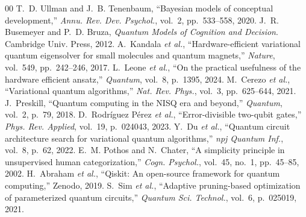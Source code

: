 \documentclass[10pt,conference]{IEEEtran}
\begin{document}
\begin{thebibliography}{00}
 T.~D. Ullman and J.~B. Tenenbaum, ``Bayesian models of conceptual development,'' \textit{Annu. Rev. Dev. Psychol.}, vol.~2, pp.~533--558, 2020.
 J.~R. Busemeyer and P.~D. Bruza, \textit{Quantum Models of Cognition and Decision}. Cambridge Univ. Press, 2012.
 A.~Kandala \textit{et al.}, ``Hardware-efficient variational quantum eigensolver for small molecules and quantum magnets,'' \textit{Nature}, vol.~549, pp.~242--246, 2017.
 L.~Leone \textit{et al.}, ``On the practical usefulness of the hardware efficient ansatz,'' \textit{Quantum}, vol.~8, p.~1395, 2024.
 M.~Cerezo \textit{et al.}, ``Variational quantum algorithms,'' \textit{Nat. Rev. Phys.}, vol.~3, pp.~625--644, 2021.
 J.~Preskill, ``Quantum computing in the NISQ era and beyond,'' \textit{Quantum}, vol.~2, p.~79, 2018.
 D.~Rodr\'iguez P\'erez \textit{et al.}, ``Error-divisible two-qubit gates,'' \textit{Phys. Rev. Applied}, vol.~19, p.~024043, 2023.
 Y.~Du \textit{et al.}, ``Quantum circuit architecture search for variational quantum algorithms,'' \textit{npj Quantum Inf.}, vol.~8, p.~62, 2022.
 E.~M. Pothos and N.~Chater, ``A simplicity principle in unsupervised human categorization,'' \textit{Cogn. Psychol.}, vol.~45, no.~1, pp.~45--85, 2002.
 H.~Abraham \textit{et al.}, ``Qiskit: An open-source framework for quantum computing,'' Zenodo, 2019.
 S.~Sim \textit{et al.}, ``Adaptive pruning-based optimization of parameterized quantum circuits,'' \textit{Quantum Sci. Technol.}, vol.~6, p.~025019, 2021.
\end{thebibliography}
\end{document}
